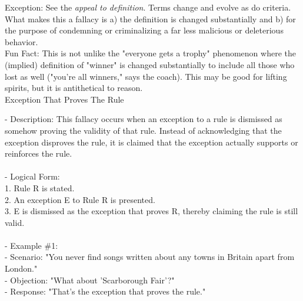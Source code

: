 \documentclass[a4paper,12pt,single,pdftex]{scrbook}
\begin{document}
    
      Exception: See the {\it appeal to definition}. Terms change and evolve as do criteria. What makes this a fallacy is a) the definition is changed substantially and b) for the purpose of condemning or criminalizing a far less malicious or deleterious behavior. 
    \\

    
      Fun Fact: This is not unlike the "everyone gets a trophy" phenomenon where the (implied) definition of "winner" is changed substantially to include all those who lost as well ("you're all winners," says the coach). This may be good for lifting spirits, but it is antithetical to reason.
    \\

  

 Exception That Proves The Rule
    
      - Description: This fallacy occurs when an exception to a rule is dismissed as somehow proving the validity of that rule. Instead of acknowledging that the exception disproves the rule, it is claimed that the exception actually supports or reinforces the rule.
    \\

    
      
    \\

    
      - Logical Form:
    \\

    
        1. Rule R is stated.
    \\

    
        2. An exception E to Rule R is presented.
    \\

    
        3. E is dismissed as the exception that proves R, thereby claiming the rule is still valid.
    \\

    
      
    \\

    
      - Example \#1:
    \\

    
        - Scenario: "You never find songs written about any towns in Britain apart from London."
    \\

    
        - Objection: "What about 'Scarborough Fair'?"
    \\

    
        - Response: "That’s the exception that proves the rule."
    \\
\end{document}
